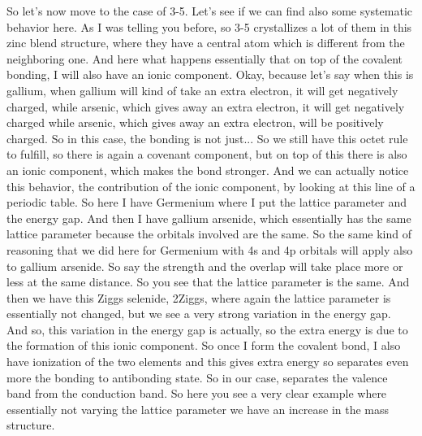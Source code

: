 So let's now move to the case of 3-5. Let's see if we can find also some systematic behavior here. As I was telling you before, so 3-5 crystallizes a lot of them in this zinc blend structure, where they have a central atom which is different from the neighboring one. And here what happens essentially that on top of the covalent bonding, I will also have an ionic component. Okay, because let's say when this is gallium, when gallium will kind of take an extra electron, it will get negatively charged, while arsenic, which gives away an extra electron, it will get negatively charged while arsenic, which gives away an extra electron, will be positively charged. So in this case, the bonding is not just... So we still have this octet rule to fulfill, so there is again a covenant component, but on top of this there is also an ionic component, which makes the bond stronger. And we can actually notice this behavior, the contribution of the ionic component, by looking at this line of a periodic table.
So here I have Germenium where I put the lattice parameter and the energy gap. And then I have gallium arsenide, which essentially has the same lattice parameter because the orbitals involved are the same. So the same kind of reasoning that we did here for Germenium with 4s and 4p orbitals will apply also to gallium arsenide. So say the strength and the overlap will take place more or less at the same distance. So you see that the lattice parameter is the same. And then we have this Ziggs selenide, 2Ziggs, where again the lattice parameter is essentially not changed, but we see a very strong variation in the energy gap. And so, this variation in the energy gap is actually, so the extra energy is due to the formation of this ionic component. So once I form the covalent bond, I also have ionization of the two elements and this gives extra energy so separates even more the bonding to antibonding state. So in our case, separates the valence band from the conduction band. So here you see a very clear example where essentially not varying the lattice parameter we have an increase in the mass structure.\\
